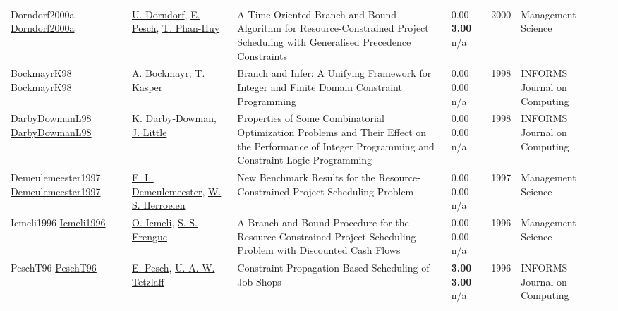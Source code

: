 {\begin{longtable}{p{3cm}p{5cm}p{10cm}p{1cm}rp{2.5cm}l}
Dorndorf2000a \href{http://dx.doi.org/10.1287/mnsc.46.10.1365.12272}{Dorndorf2000a} & \hyperref[auth:a903]{U. Dorndorf}, \hyperref[auth:a437]{E. Pesch}, \hyperref[auth:a1045]{T. Phan-Huy} & A Time-Oriented Branch-and-Bound Algorithm for Resource-Constrained Project Scheduling with Generalised Precedence Constraints & \noindent{}\textcolor{black!50}{0.00} \textbf{3.00} n/a & 2000 & Management Science & \cite{Dorndorf2000a}\\
BockmayrK98 \href{http://dx.doi.org/10.1287/ijoc.10.3.287}{BockmayrK98} & \hyperref[auth:a907]{A. Bockmayr}, \hyperref[auth:a1044]{T. Kasper} & Branch and Infer: A Unifying Framework for Integer and Finite Domain Constraint Programming & \noindent{}\textcolor{black!50}{0.00} \textcolor{black!50}{0.00} n/a & 1998 & \cellcolor{red!20}INFORMS Journal on Computing & \cite{BockmayrK98}\\
DarbyDowmanL98 \href{http://dx.doi.org/10.1287/ijoc.10.3.276}{DarbyDowmanL98} & \hyperref[auth:a177]{K. Darby-Dowman}, \hyperref[auth:a178]{J. Little} & Properties of Some Combinatorial Optimization Problems and Their Effect on the Performance of Integer Programming and Constraint Logic Programming & \noindent{}\textcolor{black!50}{0.00} \textcolor{black!50}{0.00} n/a & 1998 & \cellcolor{red!20}INFORMS Journal on Computing & \cite{DarbyDowmanL98}\\
Demeulemeester1997 \href{http://dx.doi.org/10.1287/mnsc.43.11.1485}{Demeulemeester1997} & \hyperref[auth:a1582]{E. L. Demeulemeester}, \hyperref[auth:a1583]{W. S. Herroelen} & \cellcolor{green!10}New Benchmark Results for the Resource-Constrained Project Scheduling Problem & \noindent{}\textcolor{black!50}{0.00} \textcolor{black!50}{0.00} n/a & 1997 & Management Science & \cite{Demeulemeester1997}\\
Icmeli1996 \href{http://dx.doi.org/10.1287/mnsc.42.10.1395}{Icmeli1996} & \hyperref[auth:a1551]{O. Icmeli}, \hyperref[auth:a1552]{S. S. Erenguc} & A Branch and Bound Procedure for the Resource Constrained Project Scheduling Problem with Discounted Cash Flows & \noindent{}\textcolor{black!50}{0.00} \textcolor{black!50}{0.00} n/a & 1996 & Management Science & \cite{Icmeli1996}\\
PeschT96 \href{http://dx.doi.org/10.1287/ijoc.8.2.144}{PeschT96} & \hyperref[auth:a437]{E. Pesch}, \hyperref[auth:a1215]{U. A. W. Tetzlaff} & Constraint Propagation Based Scheduling of Job Shops & \noindent{}\textbf{3.00} \textbf{3.00} n/a & 1996 & \cellcolor{red!20}INFORMS Journal on Computing & \cite{PeschT96}\\

\end{longtable}}
